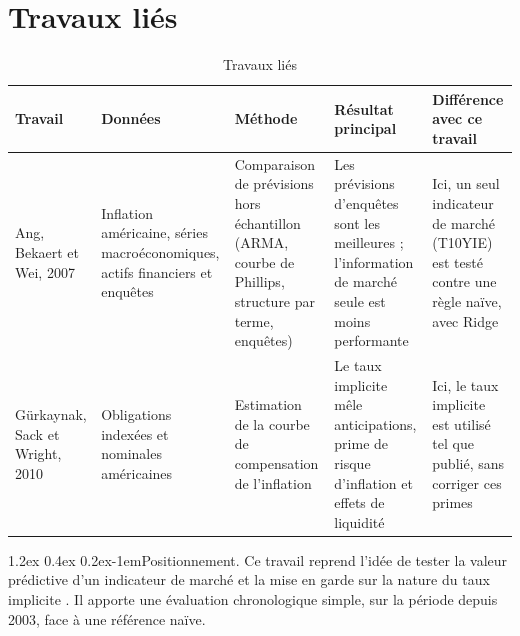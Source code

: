 \documentclass[11pt,a4paper]{article}
\makeatletter
\renewcommand\paragraph{\@startsection{paragraph}{4}{\z@}%
  {1.2ex \@plus 0.4ex \@minus 0.2ex}{-1em}{\normalfont\normalsize\bfseries}}
\makeatother
\begin{document}
\section{Travaux liés}
\label{sec:travaux}
\begin{table}[htbp]
  \centering
  \caption{Travaux liés}
  \label{tab:travaux}
  \small
  \begin{tabular}{@{}P{2.4cm} P{2.8cm} P{2.8cm} P{3.4cm} P{3.8cm}@{}}
    \toprule
    Travail & Données & Méthode & Résultat principal & Différence avec ce travail \\
    \midrule
    Ang, Bekaert et Wei, 2007 \cite{lie1} & Inflation américaine, séries macroéconomiques, actifs financiers et enquêtes & Comparaison de prévisions hors échantillon (ARMA, courbe de Phillips, structure par terme, enquêtes) & Les prévisions d'enquêtes sont les meilleures ; l'information de marché seule est moins performante & Ici, un seul indicateur de marché (T10YIE) est testé contre une règle naïve, avec Ridge \\
    Gürkaynak, Sack et Wright, 2010 \cite{lie2} & Obligations indexées et nominales américaines & Estimation de la courbe de compensation de l'inflation & Le taux implicite mêle anticipations, prime de risque d'inflation et effets de liquidité & Ici, le taux implicite est utilisé tel que publié, sans corriger ces primes \\
    \bottomrule
  \end{tabular}
\end{table}

\paragraph{Positionnement.} Ce travail reprend l'idée de tester la valeur prédictive d'un indicateur de marché \cite{lie1} et la mise en garde sur la nature du taux implicite \cite{lie2}. Il apporte une évaluation chronologique simple, sur la période depuis 2003, face à une référence naïve.

\end{document}
